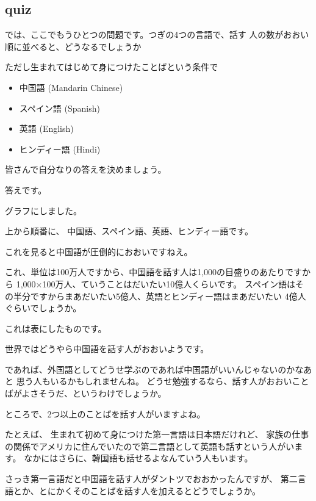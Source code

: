 \documentclass[12pt]{jlreq}
\begin{document}
\subsection{quiz}

では、ここでもうひとつの問題です。つぎの4つの言語で、話す
人の数がおおい順に並べると、どうなるでしょうか

ただし生まれてはじめて身につけたことばという条件で

\begin{itemize}
 \item  中国語 (Mandarin Chinese)
 \item  スペイン語 (Spanish)
 \item  英語 (English)
 \item  ヒンディー語 (Hindi)
\end{itemize}

皆さんで自分なりの答えを決めましょう。

\hrulefill


答えです。

グラフにしました。

上から順番に、
中国語、スペイン語、英語、ヒンディー語です。

これを見ると中国語が圧倒的におおいですねえ。

これ、単位は100万人ですから、中国語を話す人は1,000の目盛りのあたりですから
1,000$\times$100万人、ていうことはだいたい10億人くらいです。
スペイン語はその半分ですからまあだいたい5億人、英語とヒンディー語はまあだいたい
4億人ぐらいでしょうか。

\hrulefill

これは表にしたものです。

世界ではどうやら中国語を話す人がおおいようです。

であれば、外国語としてどうせ学ぶのであれば中国語がいいんじゃないのかなあと
思う人もいるかもしれませんね。
どうせ勉強するなら、話す人がおおいことばがよさそうだ、というわけでしょうか。


\hrulefill

ところで、2つ以上のことばを話す人がいますよね。

たとえば、
生まれて初めて身につけた第一言語は日本語だけれど、
家族の仕事の関係でアメリカに住んでいたので第二言語として英語も話すという人がいます。
なかにはさらに、韓国語も話せるよなんていう人もいます。

\hrulefill

さっき第一言語だと中国語を話す人がダントツでおおかったんですが、
第二言語とか、とにかくそのことばを話す人を加えるとどうでしょうか。
\end{document}
